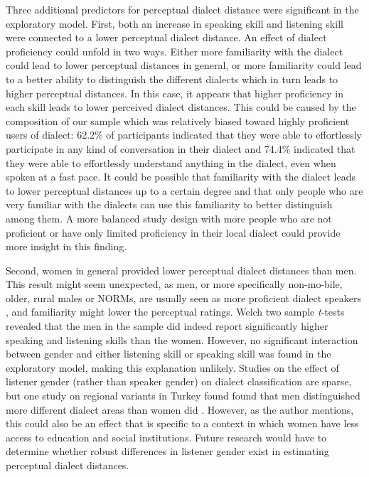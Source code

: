 \documentclass[output=paper,colorlinks,citecolor=brown,draft]{langscibook}
\begin{document}
Three additional predictors for perceptual dialect distance were significant in the exploratory model. First, both an increase in speaking skill and listening skill were connected to a lower perceptual dialect distance. An effect of dialect proficiency could unfold in two ways. Either more familiarity with the dialect could lead to lower perceptual distances in general, or more familiarity could lead to a better ability to distinguish the different dialects which in turn leads to higher perceptual distances. In this case, it appears that higher proficiency in each skill leads to lower perceived dialect distances. This could be caused by the composition of our sample which was relatively biased toward highly proficient users of dialect: 62.2\% of participants indicated that they were able to effortlessly participate in any kind of conversation in their dialect and 74.4\% indicated that they were able to effortlessly understand anything in the dialect, even when spoken at a fast pace. It could be possible that familiarity with the dialect leads to lower perceptual distances up to a certain degree and that only people who are very familiar with the dialects can use this familiarity to better distinguish among them. A more balanced study design with more people who are not proficient or have only limited proficiency in their local dialect could provide more insight in this finding.

Second, women in general provided lower perceptual dialect distances than men. This result might seem unexpected, as men, or more specifically non-mo\hyp bile, older, rural males or NORMs, are usually seen as more proficient dialect speakers \citep{chambers_dialectology_1980}, and familiarity might lower the perceptual ratings. Welch two sample \textit{t}-tests revealed that the men in the sample did indeed report significantly higher speaking and listening skills than the women. However, no significant interaction between gender and either listening skill or speaking skill was found in the exploratory model, making this explanation unlikely. Studies on the effect of listener gender (rather than speaker gender) on dialect classification are sparse, but one study on regional variants in Turkey found found that men distinguished more different dialect areas than women did \citep{demirci_gender_2002}. However, as the author mentions, this could also be an effect that is specific to a context in which women have less access to education and social institutions. Future research would have to determine whether robust differences in listener gender exist in estimating perceptual dialect distances.
\end{document}
